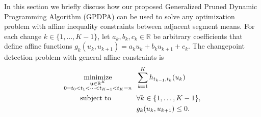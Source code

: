 \documentclass[aoas]{imsart}
\newtheorem{definition}{Definition}
\DeclareMathOperator*{\minimize}{minimize}
\newcommand{\RR}{\mathbb R}
\begin{document}
In this section we briefly discuss how our proposed Generalized Pruned
Dynamic Programming Algorithm (GPDPA) can be used to solve any
optimization problem with affine inequality constraints
between adjacent segment means. For each change $k\in\{1,\dots,K-1\}$,
let $a_k,b_k,c_k\in\RR$ be arbitrary coefficients that define affine
functions $g_k(u_k, u_{k+1})=a_k u_k + b_k u_{k+1} + c_k$. The
changepoint detection problem with general affine constraints is
\begin{align}
  \label{eq:min_general_affine_inequality}
  \minimize_{
    \substack{
    \mathbf u\in\RR^K\\
0=t_0<t_1<\cdots<t_{K-1}<t_K=n
}
    } &\ \ 
  \sum_{k=1}^K h_{t_{k-1}, t_k}(u_k)\\
  \text{subject to \hskip 0.9cm} &\ \  \forall k\in\{1,\dots,K-1\},
  \nonumber\\
&\ \ g_k(u_k, u_{k+1})\leq 0.\nonumber                        
\nonumber
\end{align}


\end{document}
